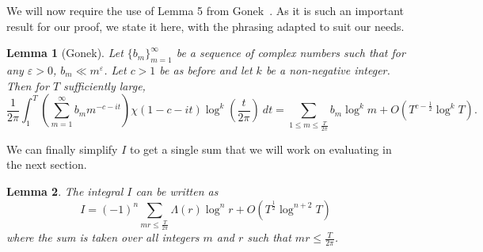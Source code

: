 \documentclass[12pt,a4paper,reqno]{amsart}
\newtheorem{lemma}{Lemma}
\theoremstyle{remark}
\numberwithin{equation}{section}
\begin{document}
We will now require the use of Lemma 5 from Gonek~\cite[Sect. 4, p. 131]{Gonek}. As it is such an important result for our proof, we state it here, with the phrasing adapted to suit our needs.

\begin{lemma}[Gonek]\label{Gonek 5}
Let $\{b_m\}_{m=1}^{\infty}$ be a sequence of complex numbers such that for any $\varepsilon>0$, $b_m \ll m^\varepsilon$. Let $c>1$ be as before and let $k$ be a non-negative integer. Then for $T$ sufficiently large,
\[
\frac{1}{2 \pi} \int_{1}^{T} \left( \sum_{m=1}^{\infty} b_m m^{-c -it} \right) \chi (1-c-it) \log ^k \left(\frac{t}{2 \pi} \right) \ dt = \sum_{1 \leq m \leq \frac{T}{2 \pi}} b_m \log^k m + O(T^{c-\frac{1}{2}} \log ^k T).
\]
\end{lemma}

We can finally simplify $I$ to get a single sum that we will work on evaluating in the next section.

\begin{lemma}\label{Lemma 11}
The integral $I$ can be written as
\[
I= (-1)^n \sum_{m r \leq \frac{T}{2 \pi}} \Lambda(r) \log^n r + O(T^{\frac{1}{2}}\log^{n+2} T)
\]
where the sum is taken over all integers $m$ and $r$ such that $mr \leq \frac{T}{2\pi}$.
\end{lemma}
\end{document}
